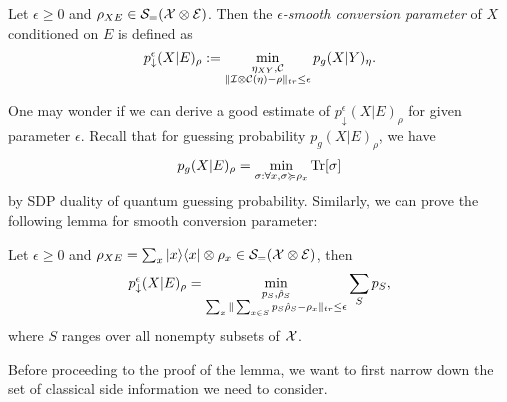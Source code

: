 \begin{definition}
    \label{defn:scgp}
    Let $\epsilon\geq 0$ and $\rho_{XE}\in \mathcal{S}_{=}(\mathcal{X}\otimes \mathcal{E})$. Then the \emph{$\epsilon$-smooth conversion parameter} of $X$ conditioned on $E$ is defined as
    $$p^{\epsilon}_{\downarrow}(X|E)_{\rho}:=\min_{\substack{\eta_{XY},\mathcal{C}\\ \Vert \mathcal{I}\otimes \mathcal{C}(\eta)-\rho\Vert_{tr}\leq \epsilon}}p_{g}(X|Y)_\eta.$$
\end{definition}

One may wonder if we can derive a good estimate of $p^{\epsilon}_{\downarrow}(X|E)_\rho$ for given parameter $\epsilon$. Recall that for guessing probability $p_g(X|E)_{\rho}$, we have
$$p_{g}(X|E)_{\rho}=\min_{\sigma:\forall x,\sigma\succcurlyeq \rho_x}\textnormal{Tr}[\sigma]$$
by SDP duality of quantum guessing probability. Similarly, we can prove the following lemma for smooth conversion parameter:
\begin{lemma}
    \label{lem:cgp}
    Let $\epsilon\geq0$ and $\rho_{XE}=\sum_x|x\rangle\langle x|\otimes \rho_x\in \mathcal{S}_{=}(\mathcal{X}\otimes \mathcal{E})$, then
    $$p^{\epsilon}_{\downarrow}(X|E)_{\rho}=\min_{\substack{p_S,\hat{\rho}_S\\ \sum_x\Vert\sum_{x\in S}p_S\hat{\rho}_S-\rho_x\Vert_{tr}\leq \epsilon}}\sum_Sp_S,$$
    where $S$ ranges over all nonempty subsets of $\mathcal{X}$.
\end{lemma}

Before proceeding to the proof of the lemma, we want to first narrow down the set of classical side information we need to consider.

